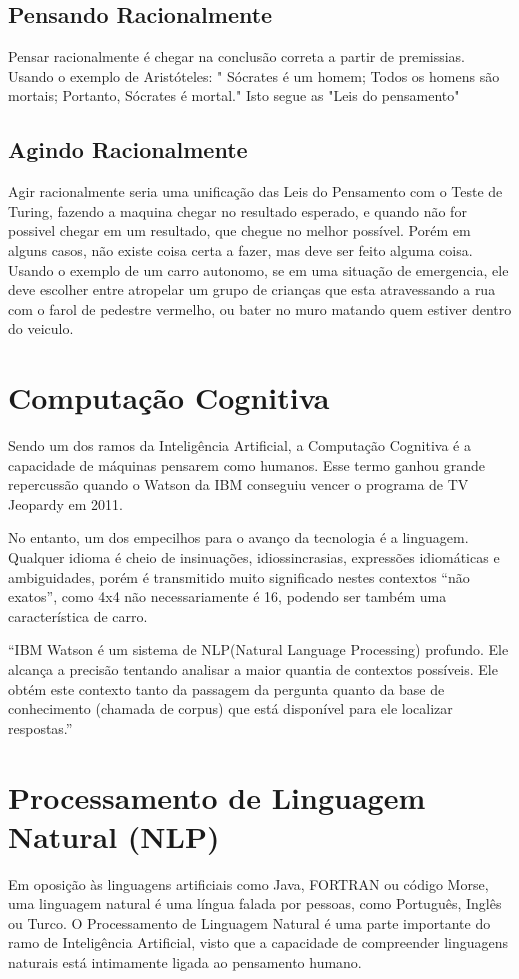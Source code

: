 \documentclass[
	12pt,				%
	openright,			%
	oneside,			%
	a4paper,			%
	english,			%
	spanish,			%
	brazil				%
	]{abntex2}
\begin{document}
	\subsection*{Pensando Racionalmente}
		Pensar racionalmente é chegar na conclusão correta a partir de premissias. Usando o exemplo de Aristóteles: "
Sócrates é um homem; Todos os homens são mortais; Portanto, Sócrates é mortal." Isto segue as "Leis do pensamento" \cite{laws_of_thought}
		
	\subsection*{Agindo Racionalmente}
		Agir racionalmente seria uma unificação das Leis do Pensamento com o Teste de Turing, fazendo a maquina chegar no resultado esperado, e quando não for possivel chegar em um resultado, que chegue no melhor possível. Porém em alguns casos, não existe coisa certa a fazer, mas deve ser feito alguma coisa. Usando o exemplo de um carro autonomo, se em uma situação de emergencia, ele deve escolher entre atropelar um grupo de crianças que esta atravessando a rua com o farol de pedestre vermelho, ou bater no muro matando quem estiver dentro do veiculo.
	
	\section{Computação Cognitiva}

	Sendo um dos ramos da Inteligência Artificial, a Computação Cognitiva é a capacidade de máquinas pensarem como humanos. Esse termo ganhou grande repercussão quando o Watson da IBM conseguiu vencer o programa de TV Jeopardy em 2011.

	No entanto, um dos empecilhos para o avanço da tecnologia é a linguagem. Qualquer idioma é cheio de insinuações, idiossincrasias, expressões idiomáticas e ambiguidades, porém é transmitido muito significado nestes contextos “não exatos”, como 4x4 não necessariamente é 16, podendo ser também uma característica de carro.

	“IBM Watson é um sistema de NLP(Natural Language Processing) profundo. Ele alcança a precisão tentando analisar a maior quantia de contextos possíveis. Ele obtém este contexto tanto da passagem da pergunta quanto da base de conhecimento (chamada de corpus) que está disponível para ele localizar respostas.” \cite{watson_manual} 

	\section{Processamento de Linguagem Natural (NLP)}
	Em oposição às linguagens artificiais como Java, FORTRAN ou código Morse, uma linguagem natural é uma língua falada por pessoas, como Português, Inglês ou Turco. O Processamento de Linguagem Natural é uma parte importante do ramo de Inteligência Artificial, visto que a capacidade de compreender linguagens naturais está intimamente ligada ao pensamento humano.
	
\end{document}
